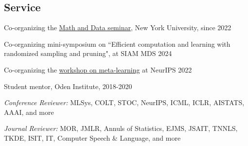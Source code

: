 \documentclass[margin, 10pt]{res} %
\begin{document}
\begin{resume}
\section{Service}
Co-organizing the \href{https://mad.cds.nyu.edu/}{Math and Data seminar}, New York University, since 2022 

Co-organizing mini-symposium on ``Efficient computation and learning with randomized sampling and pruning", at SIAM MDS 2024

Co-organizing the \href{https://meta-learn.github.io/2022/}{workshop on meta-learning} at NeurIPS 2022


Student mentor,  Oden Institute, 2018-2020

{\sl Conference Reviewer:} MLSys, COLT, STOC, NeurIPS, ICML, ICLR, AISTATS, AAAI, and more 

{\sl Journal Reviewer:} MOR, JMLR, Annuls of Statistics, EJMS, JSAIT, TNNLS, TKDE, ISIT, IT, Computer Speech \& Language, and more %


\begin{comment} 

 \section{Invited Talks}
 {``Label Propagation on Self-Supervised Representation Space."}
 	\begin{itemize}[noitemsep,topsep=0pt,parsep=0pt,partopsep=0pt]
	\item \href{https://simons.berkeley.edu/workshops/games2022-1}{Adversarial Approaches in Machine Learning Workshop}, Simons Institute, CA, 2022 
	\item \href{http://zke.fas.harvard.edu/HawaiiConference/Main.html}{New Advances in Statistics and Data Science}, Honolulu, Hawaii, 2022
\end{itemize}
 
{``Optimal Gradient-based Algorithms for Non-concave Bandit Optimization."}
 	\begin{itemize}[noitemsep,topsep=0pt,parsep=0pt,partopsep=0pt]
 		\item \href{http://bliss.eecs.berkeley.edu/Seminar/fa21/qi.html}{BLISS seminar}, UC Berkeley, virtual 2021
 		\item \href{https://simons.berkeley.edu/talks/optimal-gradient-based-algorithms-non-concave-bandit-optimization}{Sampling Algorithms and Geometries on Probability Distributions Workshop}, Simons Institute, CA, 2021 
 	\end{itemize}
 



\end{comment}
\end{resume}
\end{document}
